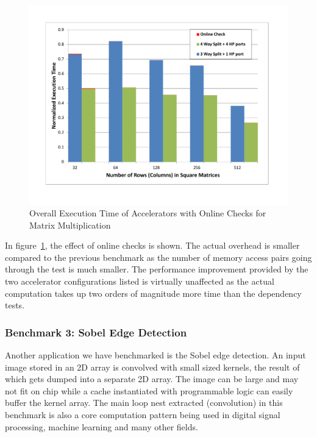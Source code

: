 \begin{figure}[htp]
\begin{center}
\includegraphics[width=1.0\linewidth]{chap6fig/mm2Phase.pdf}
\caption{Overall Execution Time of Accelerators with Online Checks for Matrix Multiplication
\label{fig:mmoverhead}}
\end{center}
\end{figure}

In figure~\ref{fig:mmoverhead}, the effect of online checks is shown. The actual overhead is smaller compared to the previous benchmark as the number of memory access pairs going through the test is
much smaller. 
The performance improvement provided by the two accelerator configurations listed is
virtually unaffected as the actual computation takes up two orders of magnitude more time than the dependency tests. 





\subsubsection{Benchmark 3: Sobel Edge Detection}
Another application we have benchmarked is the Sobel edge detection. An input image stored in an 2D array is convolved with small sized kernels, the result of which gets dumped into
a separate 2D array. The image can be large and may not fit on chip while a cache instantiated with programmable logic can easily buffer the kernel array.
The main loop nest extracted (convolution) in this benchmark is also a core computation pattern being used in digital signal processing, machine learning and many other fields. 

